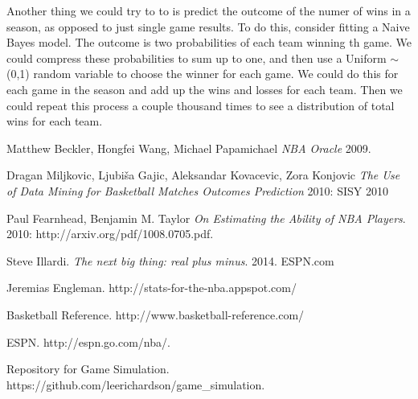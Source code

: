 \documentclass{article}
\begin{document}
	Another thing we could try to to is predict the outcome of the numer of wins in a season, as opposed to just single game results. To do this, consider fitting a Naive Bayes model. The outcome is two probabilities of each team winning th game. We could compress these probabilities to sum up to one, and then use a Uniform $\sim$ (0,1) random variable to choose the winner for each game. We could do this for each game in the season and add up the wins and losses for each team. Then we could repeat this process a couple thousand times to see a distribution of total wins for each team. 
	
	

 
  \begin{thebibliography}{1}

   Matthew Beckler, Hongfei Wang, Michael Papamichael {\em NBA Oracle} 2009.

   Dragan Miljkovic, Ljubiša Gajic, Aleksandar Kovacevic, Zora Konjovic {\em The Use of Data Mining for Basketball Matches
Outcomes Prediction} 2010: SISY 2010

   Paul Fearnhead, Benjamin M. Taylor {\em On Estimating the Ability of NBA Players}. 2010: http://arxiv.org/pdf/1008.0705.pdf.

   Steve Illardi. {\em The next big thing: real plus minus}. 2014. ESPN.com

   Jeremias Engleman. http://stats-for-the-nba.appspot.com/

   Basketball Reference. http://www.basketball-reference.com/

   ESPN. http://espn.go.com/nba/.

   Repository for Game Simulation. https://github.com/leerichardson/game\_simulation.

  \end{thebibliography}
\end{document}
